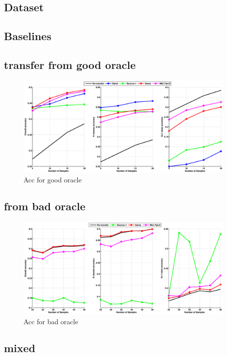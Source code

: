 \subsection{Dataset}

\subsection{Baselines}

\subsection{transfer from good oracle}
\begin{figure}
\includegraphics[width=\textwidth,height=5cm]{fig/good_test.eps}
\caption{Acc for good oracle}
\end{figure}
\subsection{from bad oracle}
\begin{figure}
\includegraphics[width=\textwidth,height=5cm]{fig/bad_test.eps}
\caption{Acc for bad oracle}
\end{figure}
\subsection{mixed}

